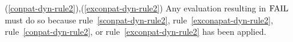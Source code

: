 \replacement{\theidstatus}{\begin{equation}	%
\frac{\E,\V\ts\pat\ra\VE/\fail}
     {\E,\V\ts\layeredpata\ra\{\var\mapsto\V\}+\VE/\fail}
\end{equation}}{\begin{equation}	%
\frac{\E,\V\ts\pat\ra\VE/\fail
      }
     {\E,\V\ts\layeredvidpata\ra\{\vid\mapsto(\V,\isv)\}+\VE/\fail}
\end{equation}}
%
%
\comments
\begin{description}
\item{(\ref{conpat-dyn-rule2}),(\ref{exconpat-dyn-rule2})}
  Any evaluation resulting in ${\rm FAIL}$ must do so because 
rule~\ref{sconpat-dyn-rule2},
rule~\ref{exconapat-dyn-rule2},
rule~\ref{conpat-dyn-rule2},
or rule~\ref{exconpat-dyn-rule2} has been
applied.
\end{description}
